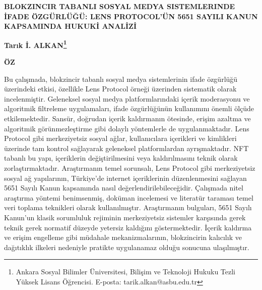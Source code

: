 \documentclass[11pt,a4paper]{article}
\begin{document}
\begin{center}
    \fontsize{15}{18}\selectfont\bfseries\MakeUppercase{BLOKZINCIR TABANLI SOSYAL MEDYA SISTEMLERINDE İFADE ÖZGÜRLÜĞÜ: LENS PROTOCOL'ÜN 5651 SAYILI KANUN KAPSAMINDA HUKUKİ ANALİZİ}
    \vspace{1.5em}
\end{center}

\begin{flushright}
    \fontsize{13}{15}\selectfont\bfseries
    Tarık İ. ALKAN\footnote{Ankara Sosyal Bilimler Üniversitesi, Bilişim ve Teknoloji Hukuku Tezli Yüksek Lisans Öğrencisi. E-posta: tarik.alkan@asbu.edu.tr}
\end{flushright}

\vspace{2em}

\noindent\fontsize{11}{13}\selectfont\bfseries ÖZ

\vspace{0.5em}

\fontsize{11}{13}\selectfont\normalfont
\setlength{\parindent}{0.75cm}
\justify
Bu çalışmada, blokzincir tabanlı sosyal medya sistemlerinin ifade özgürlüğü üzerindeki etkisi, özellikle Lens Protocol örneği üzerinden sistematik olarak incelenmiştir. Geleneksel sosyal medya platformlarındaki içerik moderasyonu ve algoritmik filtreleme uygulamaları, ifade özgürlüğünün kullanımını önemli ölçüde etkilemektedir. Sansür, doğrudan içerik kaldırmanın ötesinde, erişim azaltma ve algoritmik görünmezleştirme gibi dolaylı yöntemlerle de uygulanmaktadır. Lens Protocol gibi merkeziyetsiz sosyal ağlar, kullanıcılara içerikleri ve kimlikleri üzerinde tam kontrol sağlayarak geleneksel platformlardan ayrışmaktadır. NFT tabanlı bu yapı, içeriklerin değiştirilmesini veya kaldırılmasını teknik olarak zorlaştırmaktadır. Araştırmanın temel sorunsalı, Lens Protocol gibi merkeziyetsiz sosyal ağ yapılarının, Türkiye'de internet içeriklerinin düzenlenmesini sağlayan 5651 Sayılı Kanun kapsamında nasıl değerlendirilebileceğidir. Çalışmada nitel araştırma yöntemi benimsenmiş, doküman incelemesi ve literatür taraması temel veri toplama teknikleri olarak kullanılmıştır. Araştırmanın bulguları, 5651 Sayılı Kanun'un klasik sorumluluk rejiminin merkeziyetsiz sistemler karşısında gerek teknik gerek normatif düzeyde yetersiz kaldığını göstermektedir. İçerik kaldırma ve erişim engelleme gibi müdahale mekanizmalarının, blokzincirin kalıcılık ve dağıtıklık ilkeleri nedeniyle pratikte uygulanamaz olduğu sonucuna ulaşılmıştır.
\end{document}
